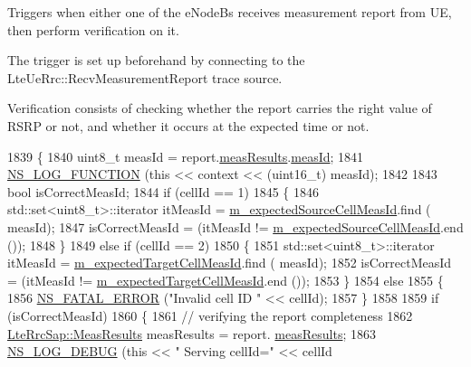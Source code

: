 Triggers when either one of the e\+Node\+Bs receives measurement report from UE, then perform verification on it. 

The trigger is set up beforehand by connecting to the {\ttfamily Lte\+Ue\+Rrc\+::\+Recv\+Measurement\+Report} trace source.

Verification consists of checking whether the report carries the right value of R\+S\+RP or not, and whether it occurs at the expected time or not. 
\begin{DoxyCode}
1839 \{
1840   uint8\_t measId = report.\hyperlink{structns3_1_1LteRrcSap_1_1MeasurementReport_a84a65ffec25d719fdcba03fb28ca5b86}{measResults}.\hyperlink{structns3_1_1LteRrcSap_1_1MeasResults_a1608bbea7e59da137c1b58d3bf55e907}{measId};
1841   \hyperlink{log-macros-disabled_8h_a90b90d5bad1f39cb1b64923ea94c0761}{NS\_LOG\_FUNCTION} (\textcolor{keyword}{this} << context << (uint16\_t) measId);
1842 
1843   \textcolor{keywordtype}{bool} isCorrectMeasId;
1844   \textcolor{keywordflow}{if} (cellId == 1)
1845     \{
1846       std::set<uint8\_t>::iterator itMeasId = \hyperlink{classLteUeMeasurementsHandoverTestCase_aca431e1ebc93460a53628630a534c474}{m\_expectedSourceCellMeasId}.find (
      measId);
1847       isCorrectMeasId = (itMeasId != \hyperlink{classLteUeMeasurementsHandoverTestCase_aca431e1ebc93460a53628630a534c474}{m\_expectedSourceCellMeasId}.end ());
1848     \}
1849   \textcolor{keywordflow}{else} \textcolor{keywordflow}{if} (cellId == 2)
1850     \{
1851       std::set<uint8\_t>::iterator itMeasId = \hyperlink{classLteUeMeasurementsHandoverTestCase_a63388a20a3de7adc15907242f6e4a8bf}{m\_expectedTargetCellMeasId}.find (
      measId);
1852       isCorrectMeasId = (itMeasId != \hyperlink{classLteUeMeasurementsHandoverTestCase_a63388a20a3de7adc15907242f6e4a8bf}{m\_expectedTargetCellMeasId}.end ());
1853     \}
1854   \textcolor{keywordflow}{else}
1855     \{
1856       \hyperlink{group__fatal_ga5131d5e3f75d7d4cbfd706ac456fdc85}{NS\_FATAL\_ERROR} (\textcolor{stringliteral}{"Invalid cell ID "} << cellId);
1857     \}
1858 
1859   \textcolor{keywordflow}{if} (isCorrectMeasId)
1860     \{
1861       \textcolor{comment}{// verifying the report completeness}
1862       \hyperlink{structns3_1_1LteRrcSap_1_1MeasResults}{LteRrcSap::MeasResults} measResults = report.
      \hyperlink{structns3_1_1LteRrcSap_1_1MeasurementReport_a84a65ffec25d719fdcba03fb28ca5b86}{measResults};
1863       \hyperlink{group__logging_ga413f1886406d49f59a6a0a89b77b4d0a}{NS\_LOG\_DEBUG} (\textcolor{keyword}{this} << \textcolor{stringliteral}{" Serving cellId="} << cellId

\end{DoxyCode}
